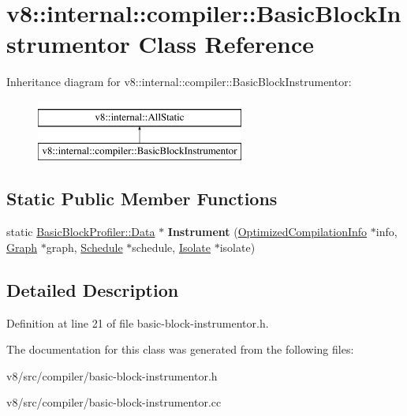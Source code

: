 \hypertarget{classv8_1_1internal_1_1compiler_1_1BasicBlockInstrumentor}{}\section{v8\+:\+:internal\+:\+:compiler\+:\+:Basic\+Block\+Instrumentor Class Reference}
\label{classv8_1_1internal_1_1compiler_1_1BasicBlockInstrumentor}
Inheritance diagram for v8\+:\+:internal\+:\+:compiler\+:\+:Basic\+Block\+Instrumentor\+:\begin{figure}[H]
\begin{center}
\leavevmode
\includegraphics[height=2.000000cm]{classv8_1_1internal_1_1compiler_1_1BasicBlockInstrumentor}
\end{center}
\end{figure}
\subsection*{Static Public Member Functions}
\begin{DoxyCompactItemize}
\item 
\mbox{\label{classv8_1_1internal_1_1compiler_1_1BasicBlockInstrumentor_aa8fc4e5ce1e7e48b986bcb5ba6fba771}} 
static \mbox{\hyperlink{classv8_1_1internal_1_1BasicBlockProfiler_1_1Data}{Basic\+Block\+Profiler\+::\+Data}} $\ast$ {\bfseries Instrument} (\mbox{\hyperlink{classv8_1_1internal_1_1OptimizedCompilationInfo}{Optimized\+Compilation\+Info}} $\ast$info, \mbox{\hyperlink{classv8_1_1internal_1_1compiler_1_1Graph}{Graph}} $\ast$graph, \mbox{\hyperlink{classv8_1_1internal_1_1compiler_1_1Schedule}{Schedule}} $\ast$schedule, \mbox{\hyperlink{classv8_1_1internal_1_1Isolate}{Isolate}} $\ast$isolate)
\end{DoxyCompactItemize}


\subsection{Detailed Description}


Definition at line 21 of file basic-\/block-\/instrumentor.\+h.



The documentation for this class was generated from the following files\+:\begin{DoxyCompactItemize}
\item 
v8/src/compiler/basic-\/block-\/instrumentor.\+h\item 
v8/src/compiler/basic-\/block-\/instrumentor.\+cc\end{DoxyCompactItemize}

